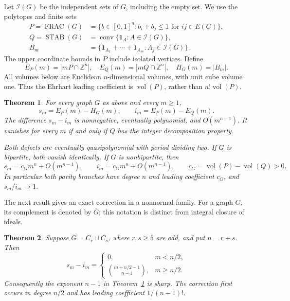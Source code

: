 \documentclass[11pt]{article}
\newtheorem{theorem}{Theorem}[section]
\theoremstyle{remark}
\newcommand{\ZZ}{\mathbb Z}
\newcommand{\one}{\mathbf 1}
\newcommand{\conv}{\operatorname{conv}}
\newcommand{\vol}{\operatorname{vol}}
\newcommand{\FRAC}{\operatorname{FRAC}}
\newcommand{\STAB}{\operatorname{STAB}}
\begin{document}
Let $\mathcal I(G)$ be the independent sets of $G$, including the empty
set. We use the polytopes and finite sets
\begin{align*}
P=\FRAC(G)&=\{b\in[0,1]^n:b_i+b_j\leq1\text{ for }ij\in E(G)\},\\
Q=\STAB(G)&=\conv\{\one_A:A\in\mathcal I(G)\},\\
B_m&=\{\one_{A_1}+\cdots+\one_{A_m}:A_j\in\mathcal I(G)\}.
\end{align*}
The upper coordinate bounds in $P$ include isolated vertices. Define
\[
E_P(m)=|mP\cap\ZZ^n|,\quad E_Q(m)=|mQ\cap\ZZ^n|,
\quad H_G(m)=|B_m|.
\]
All volumes below are Euclidean $n$-dimensional volumes, with unit cube
volume one. Thus the Ehrhart leading coefficient is $\vol(P)$, rather
than $n!\vol(P)$.

\begin{theorem}\label{thm:main}
For every graph $G$ as above and every $m\geq1$,
\begin{equation}\label{eq:dictionary}
s_m=E_P(m)-H_G(m),\qquad i_m=E_P(m)-E_Q(m).
\end{equation}
The difference $s_m-i_m$ is nonnegative, eventually polynomial, and
$O(m^{n-1})$. It vanishes for every $m$ if and only if $Q$ has the integer
decomposition property.

Both defects are eventually quasipolynomial with period dividing two.
If $G$ is bipartite, both vanish identically. If $G$ is nonbipartite, then
\begin{equation}\label{eq:asymptotic}
s_m=c_Gm^n+O(m^{n-1}),\qquad
i_m=c_Gm^n+O(m^{n-1}),\qquad
c_G=\vol(P)-\vol(Q)>0.
\end{equation}
In particular both parity branches have degree $n$ and leading coefficient
$c_G$, and $s_m/i_m\longrightarrow1$.
\end{theorem}

The next result gives an exact correction in a nonnormal family. For a
graph $G$, its complement is denoted by $\overline G$; this notation is
distinct from integral closure of ideals.

\begin{theorem}\label{thm:correction}
Suppose $\overline G=C_r\sqcup C_s$, where $r,s\geq5$ are odd, and put
$n=r+s$. Then
\begin{equation}\label{eq:correction}
s_m-i_m=
\begin{cases}
0,&m<n/2,\\[2pt]
\displaystyle\binom{m+n/2-1}{n-1},&m\geq n/2.
\end{cases}
\end{equation}
Consequently the exponent $n-1$ in Theorem~\ref{thm:main} is sharp. The
correction first occurs in degree $n/2$ and has leading coefficient
$1/(n-1)!$.
\end{theorem}
\end{document}

